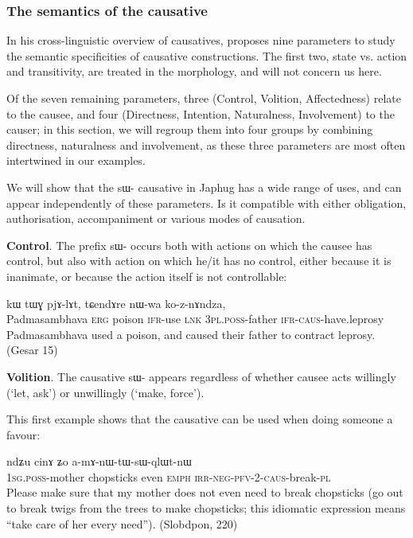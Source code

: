 \documentclass[oldfontcommands,oneside,a4paper,11pt]{article}
\newcommand{\ipa}[1]{{\phon \mbox{#1}}} %
\newcommand{\sg}{\textsc{sg}}
\newcommand{\pl}{\textsc{pl}}
\newcommand{\pfv}{\textsc{pfv}}
\newcommand{\caus}{\textsc{caus}}
\newcommand{\lnk}{\textsc{lnk}}
\newcommand{\erg}{\textsc{erg}}
\newcommand{\emphat}{\textsc{emph}}
\newcommand{\evd}{\textsc{ifr}}
\newcommand{\irr}{\textsc{irr}}
\newcommand{\negat}{\textsc{neg}}
\newcommand{\poss}{\textsc{poss}}
\begin{document}


\subsubsection{The semantics of the causative } \label{subsub:caus.semantics}
In his cross-linguistic overview of causatives, \citet[62-68]{dixon00causative} proposes nine parameters to study the semantic specificities of causative constructions. The first two, state vs. action and transitivity, are treated in the morphology, and will not concern us here. 

Of the seven remaining parameters, three (Control, Volition, Affectedness) relate to the causee, and four (Directness, Intention, Naturalness, Involvement) to the causer; in this section, we will regroup them into four groups by combining directness, naturalness and involvement, as these three parameters are most often intertwined in our examples.

 
 We will show that the \ipa{sɯ-} causative in Japhug has a wide range of uses, and can appear independently of these parameters. Is it compatible with either obligation, authorisation, accompaniment or various modes of causation. 
 
   \textbf{Control}. The prefix \ipa{sɯ-} occurs both with actions on which the causee has control, but also with action on which he/it has no control, either because it is inanimate, or because the action itself is not controllable:
 \begin{exe}
\ex 
\gll  \ipa{ɯrɟɤnpanma} 	\ipa{kɯ} 	\ipa{tɯɣ} 	\ipa{pjɤ-lɤt,} 	\ipa{tɕendɤre} 	\ipa{nɯ-wa} 	\ipa{ko-z-nɤndza,}  \\
Padmasambhava \erg{} poison \evd{}-use \lnk{} 3\pl{}.\poss{}-father \evd{}-\caus{}-have.leprosy \\
 \glt Padmasambhava used a poison, and caused their father to contract leprosy.    (Gesar 15)
\end{exe}

 \textbf{Volition}. The causative \ipa{sɯ-} appears regardless of whether causee acts willingly (`let, ask') or unwillingly (`make, force').
 
 This first example shows that the causative can be used when doing someone a favour:
  \begin{exe}
\ex 
\gll   \ipa{a-mu} 	\ipa{ndʑu} 	\ipa{cinɤ}	\ipa{ʑo} 	\ipa{a-mɤ-nɯ-tɯ-sɯ-qlɯt-nɯ} \\
  1\sg{}.\poss{}-mother chopsticks even \emphat{} \irr{}-\negat{}-\pfv{}-2-\caus{}-break-\pl{} \\
 \glt    Please make sure that my mother does not even need to break chopsticks (go out to break twigs from the trees to make chopsticks; this idiomatic expression means ``take care of her every need''). (Slobdpon, 220)
\end{exe}
\end{document}
